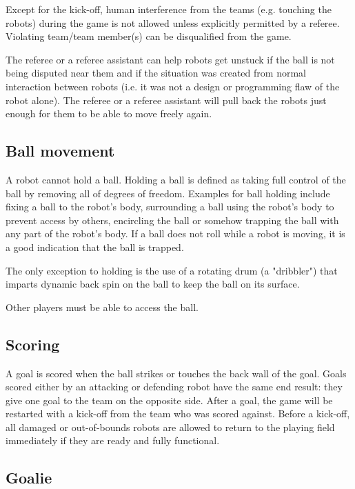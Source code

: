 \documentclass{article}
\begin{document}
Except for the kick-off, human interference from the teams (e.g. touching the
robots) during the game is not allowed unless explicitly permitted by a
referee. Violating team/team member(s) can be disqualified from the game.

The referee or a referee assistant can help robots get unstuck if the ball
is not being disputed near them and if the situation was created from normal
interaction between robots (i.e. it was not a design or programming flaw of
the robot alone). The referee or a referee assistant will pull back the robots
just enough for them to be able to move freely again.

\subsection{Ball movement \label{ref-006}}

A robot cannot hold a ball. Holding a ball is defined as taking full control
of the ball by removing all of degrees of freedom. Examples for ball holding
include fixing a ball to the robot's body, surrounding a ball using the robot's
body to prevent access by others, encircling the ball or somehow trapping the
ball with any part of the robot's body. If a ball does not roll while a robot is
moving, it is a good indication that the ball is trapped.

The only exception to holding is the use of a rotating drum (a "dribbler") that
imparts dynamic back spin on the ball to keep the ball on its surface.

Other players must be able to access the ball.

\subsection{Scoring \label{ref-007}}

A goal is scored when the ball strikes or touches the back wall of the goal.
Goals scored either by an attacking or defending robot have the same end
result: they give one goal to the team on the opposite side. After a goal, the
game will be restarted with a kick-off from the team who was scored against.
Before a kick-off, all damaged or out-of-bounds robots are allowed to return to
the playing field immediately if they are ready and fully functional.

\subsection{Goalie \label{ref-008}}
\end{document}
